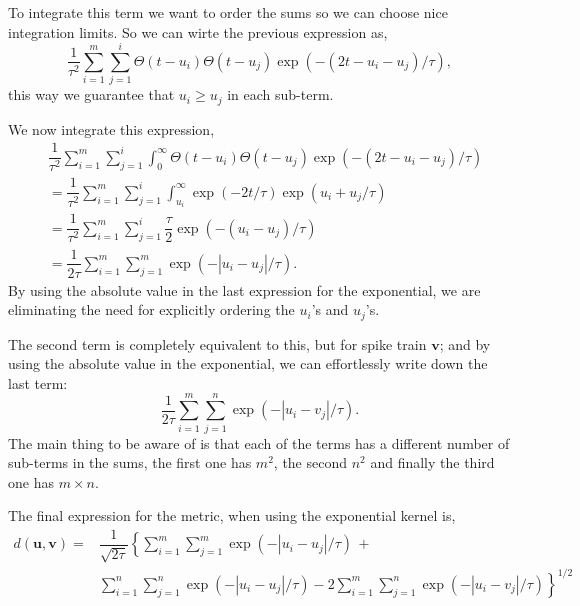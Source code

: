 \documentclass[10pt,a4paper]{book}
\begin{document}
To integrate this term we want to order the sums so we can choose nice integration limits. So we can wirte the previous expression as,
\begin{equation}
\dfrac{1}{\tau^2} \sum_{i=1}^{m}\sum_{j=1}^{i} \Theta(t - u_i)  \Theta(t - u_j) \exp(-(2t -u_i -u_j)/\tau),
\end{equation}
this way we guarantee that $u_i \ge u_j$ in each sub-term.

We now integrate this expression,
\begin{align}
&\dfrac{1}{\tau^2} \sum_{i=1}^{m}\sum_{j=1}^{i} \int_{0}^{\infty} \Theta(t - u_i)  \Theta(t - u_j) \exp(-(2t -u_i -u_j)/\tau) 
\nonumber \\
& = \dfrac{1}{\tau^2} \sum_{i=1}^{m}\sum_{j=1}^{i} \int_{u_i}^{\infty} \exp(-2t/\tau) \exp( u_i + u_j/\tau) \nonumber  \\
& = \dfrac{1}{\tau^2} \sum_{i=1}^{m}\sum_{j=1}^{i} \dfrac{\tau}{2} \exp( -(u_i - u_j)/\tau) \nonumber \\
& = \dfrac{1}{2\tau} \sum_{i=1}^{m}\sum_{j=1}^{m} \exp( -|u_i - u_j|/\tau).
\end{align}
By using the absolute value in the last expression for the exponential, we are eliminating the need for explicitly ordering the $u_i$'s and $u_j$'s.

The second term is completely equivalent to this, but for spike train $\mathbf{v}$; and by using the absolute value in the exponential, we can effortlessly write down the last term:
\begin{equation}
\dfrac{1}{2\tau} \sum_{i=1}^{m}\sum_{j=1}^{n} \exp( -|u_i - v_j|/\tau).
\end{equation}
The main thing to be aware of is that each of the terms has a different number of sub-terms in the sums, the first one has $m^2$, the second $n^2$ and finally the third one has $m\times n$.

The final expression for the metric, when using the exponential kernel is,
\begin{align}
d(\mathbf{u}, \mathbf{v}) = & \dfrac{1}{\sqrt{2\tau}}  \left\lbrace \sum_{i=1}^{m}\sum_{j=1}^{m} \exp( -|u_i - u_j|/\tau) \,+ \right. \nonumber \\ 
& \left. \sum_{i=1}^{n}\sum_{j=1}^{n} \exp( -|u_i - u_j|/\tau) - 2\sum_{i=1}^{m}\sum_{j=1}^{n} \exp( -|u_i - v_j|/\tau) \right\rbrace ^{1/2}
\end{align}
\end{document}
